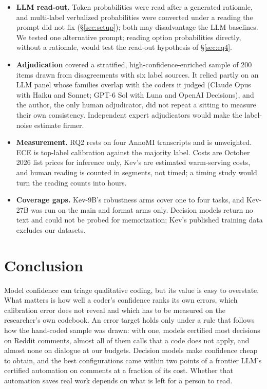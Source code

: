 \begin{itemize}
  exploratory; a registered replication on new codebooks would confirm or correct them.
  \item \textbf{LLM read-out.} Token probabilities were read after a generated rationale, and multi-label verbalized
  probabilities were converted under a reading the prompt did not fix (\S\ref{sec:setup}); both may disadvantage the LLM
  baselines. We tested one alternative prompt; reading option probabilities directly, without a rationale, would test the
  read-out hypothesis of \S\ref{sec:eq4}.
  \item \textbf{Adjudication} covered a stratified, high-confidence-enriched sample of 200 items drawn from disagreements with
  six label sources. It relied partly on an LLM panel whose families overlap with the coders it judged (Claude Opus with Haiku
  and Sonnet; GPT-6 Sol with Luna and OpenAI Decisions), and the author, the only human adjudicator, did not repeat a sitting to
  measure their own consistency. Independent expert adjudicators would make the label-noise estimate firmer.
  \item \textbf{Measurement.} RQ2 rests on four AnnoMI transcripts and is unweighted. ECE is top-label calibration against the
  majority label. Costs are October 2026 list prices for inference only, Kev's are estimated warm-serving costs, and human
  reading is counted in segments, not timed; a timing study would turn the reading counts into hours.
  \item \textbf{Coverage gaps.} Kev-9B's robustness arms cover one to four tasks, and Kev-27B was run on the main and format
  arms only. Decision models return no text and could not be probed for memorization; Kev's published training data excludes
  our datasets.
\end{itemize}

\section{Conclusion}
\label{sec:conclusion}
Model confidence can triage qualitative coding, but its value is easy to overstate. What matters is how well a coder's
confidence ranks its own errors, which calibration error does not reveal and which has to be measured on the researcher's own
codebook. An error target holds only under a rule that follows how the hand-coded sample was drawn: with one, models certified
most decisions on Reddit comments, almost all of them calls that a code does not apply, and almost none on dialogue at our
budgets. Decision models make confidence cheap to obtain, and the best configurations came within two points of a frontier LLM's
certified automation on comments at a fraction of its cost. Whether that automation saves real work depends on what is left
for a person to read.

